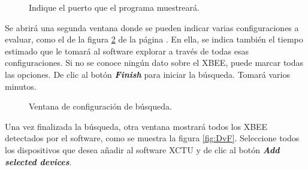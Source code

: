 \begin{figure}[H] %
\caption{Indique el puerto que el programa muestreará.}
\label{fig:PS}
\end{figure}

Se abrirá una segunda ventana donde se pueden indicar varias configuraciones a evaluar, como el de la figura \ref{fig:PSe} de la página \pageref{fig:PSe}. En ella, se indica también el tiempo estimado que le tomará al software explorar a través de todas esas configuraciones. Si no se conoce ningún dato sobre el XBEE, puede marcar todas las opciones. De clic al botón \textit{\textbf{Finish}} para iniciar la búsqueda. Tomará varios minutos.

\begin{figure}[H] %
\caption{Ventana de configuración de búsqueda.}
\label{fig:PSe}
\end{figure}

Una vez finalizada la búsqueda, otra ventana mostrará todos los XBEE detectados por el software, como se muestra la figura \ref{fig:DvF}. Seleccione todos los dispositivos que desea añadir al software XCTU y de clic al botón \textit{\textbf{Add selected devices}}.

